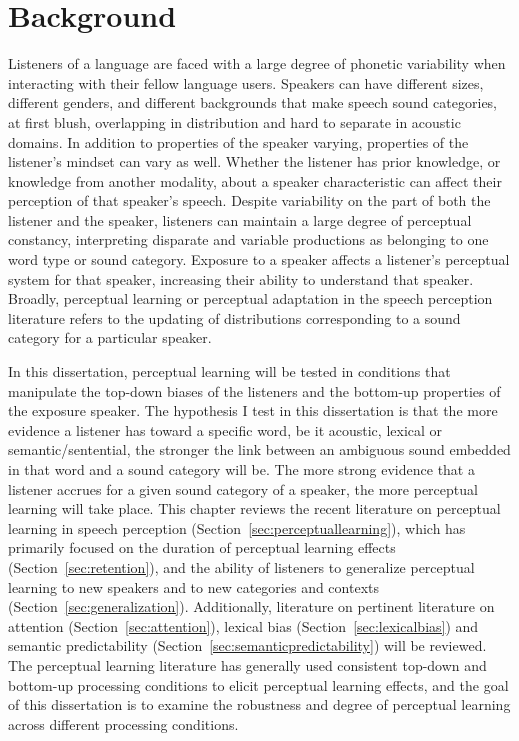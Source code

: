 
\chapter{Background}

Listeners of a language are faced with a large degree of phonetic variability when interacting with their fellow language users.  
Speakers can have different sizes, different genders, and different backgrounds that make speech sound categories, at first blush, overlapping in distribution and hard to separate in acoustic domains.
In addition to properties of the speaker varying, properties of the listener's mindset can vary as well.  
Whether the listener has prior knowledge, or knowledge from another modality, about a speaker characteristic can affect their perception of that speaker's speech.
Despite variability on the part of both the listener and the speaker, listeners can maintain a large degree of perceptual constancy, interpreting disparate and variable productions as belonging to one word type or sound category.
Exposure to a speaker affects a listener's perceptual system for that speaker, increasing their ability to understand that speaker.
Broadly, perceptual learning or perceptual adaptation in the speech perception literature refers to the updating of distributions corresponding to a sound category for a particular speaker.

In this dissertation, perceptual learning will be tested in conditions that manipulate the top-down biases of the listeners and the bottom-up properties of the exposure speaker.
The hypothesis I test in this dissertation is that the more evidence a listener has toward a specific word, be it acoustic, lexical or semantic/sentential, the stronger the link between an ambiguous sound embedded in that word and a sound category will be.
The more strong evidence that a listener accrues for a given sound category of a speaker, the more perceptual learning will take place.
This chapter reviews the recent literature on perceptual learning in speech perception (Section~\ref{sec:perceptuallearning}), which has primarily focused on the duration of perceptual learning effects (Section~\ref{sec:retention}), and the ability of listeners to generalize perceptual learning to new speakers  and to new categories and contexts (Section~\ref{sec:generalization}). 
Additionally, literature on pertinent literature on attention (Section~\ref{sec:attention}), lexical bias (Section~\ref{sec:lexicalbias}) and semantic predictability (Section~\ref{sec:semanticpredictability}) will be reviewed.
The perceptual learning literature has generally used consistent top-down and bottom-up processing conditions to elicit perceptual learning effects, and the goal of this dissertation is to examine the robustness and degree of perceptual learning across different processing conditions.

